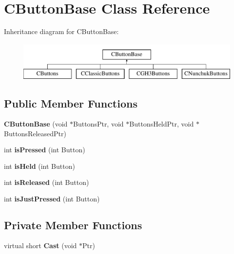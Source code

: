 \hypertarget{class_c_button_base}{\section{C\-Button\-Base Class Reference}
\label{class_c_button_base}
}
Inheritance diagram for C\-Button\-Base\-:\begin{figure}[H]
\begin{center}
\leavevmode
\includegraphics[height=2.000000cm]{class_c_button_base}
\end{center}
\end{figure}
\subsection*{Public Member Functions}
\begin{DoxyCompactItemize}
\item 
\hypertarget{class_c_button_base_a9c86334a1e2b3ba2c771b2e574c3dc67}{{\bfseries C\-Button\-Base} (void $\ast$Buttons\-Ptr, void $\ast$Buttons\-Held\-Ptr, void $\ast$Buttons\-Released\-Ptr)}\label{class_c_button_base_a9c86334a1e2b3ba2c771b2e574c3dc67}

\item 
\hypertarget{class_c_button_base_a0d4758b9e756a8c3c2bb39b907ea9170}{int {\bfseries is\-Pressed} (int Button)}\label{class_c_button_base_a0d4758b9e756a8c3c2bb39b907ea9170}

\item 
\hypertarget{class_c_button_base_a67e38daead9d22e33f6a3d85902d1f98}{int {\bfseries is\-Held} (int Button)}\label{class_c_button_base_a67e38daead9d22e33f6a3d85902d1f98}

\item 
\hypertarget{class_c_button_base_a575dee487bcca1abf29c1084dfdd5bb8}{int {\bfseries is\-Released} (int Button)}\label{class_c_button_base_a575dee487bcca1abf29c1084dfdd5bb8}

\item 
\hypertarget{class_c_button_base_ab74fd21217c5e379a613b7474af4f9b8}{int {\bfseries is\-Just\-Pressed} (int Button)}\label{class_c_button_base_ab74fd21217c5e379a613b7474af4f9b8}

\end{DoxyCompactItemize}
\subsection*{Private Member Functions}
\begin{DoxyCompactItemize}
\item 
\hypertarget{class_c_button_base_aa2accc210e6c60b8d4aec8ea5ee4a9d8}{virtual short {\bfseries Cast} (void $\ast$Ptr)}\label{class_c_button_base_aa2accc210e6c60b8d4aec8ea5ee4a9d8}

\end{DoxyCompactItemize}
